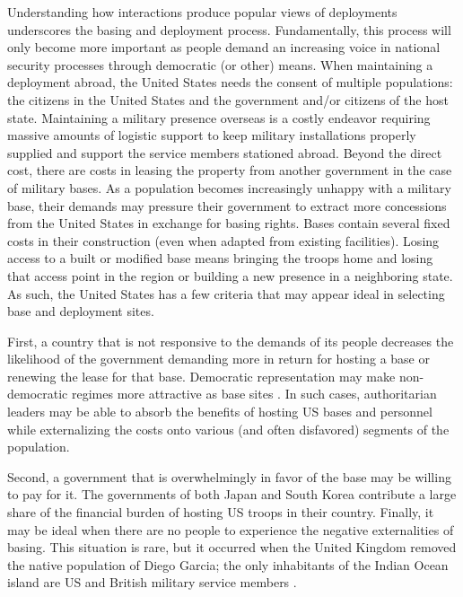 Understanding how interactions produce popular views of deployments underscores the basing and deployment process. Fundamentally, this process will only become more important as people demand an increasing voice in national security processes through democratic (or other) means. When maintaining a deployment abroad, the United States needs the consent of multiple populations: the citizens in the United States and the government and/or citizens of the host state. Maintaining a military presence overseas is a costly endeavor requiring massive amounts of logistic support to keep military installations properly supplied and support the service members stationed abroad. Beyond the direct cost, there are costs in leasing the property from another government in the case of military bases. As a population becomes increasingly unhappy with a military base, their demands may pressure their government to extract more concessions from the United States in exchange for basing rights. Bases contain several fixed costs in their construction (even when adapted from existing facilities). Losing access to a built or modified base means bringing the troops home and losing that access point in the region or building a new presence in a neighboring state. As such, the United States has a few criteria that may appear ideal in selecting base and deployment sites. 

First, a country that is not responsive to the demands of its people decreases the likelihood of the government demanding more in return for hosting a base or renewing the lease for that base. Democratic representation may make non-democratic regimes more attractive as base sites \cite{Allen2011}. In such cases, authoritarian leaders may be able to absorb the benefits of hosting US bases and personnel while externalizing the costs onto various (and often disfavored) segments of the population.

Second, a government that is overwhelmingly in favor of the base may be willing to pay for it. The governments of both Japan and South Korea contribute a large share of the financial burden of hosting US troops in their country. Finally, it may be ideal when there are no people to experience the negative externalities of basing. This situation is rare, but it occurred when the United Kingdom removed the native population of Diego Garcia; the only inhabitants of the Indian Ocean island are US and British military service members \cite{Johnson2004,Vine2004,vinejeffery2009}. 

